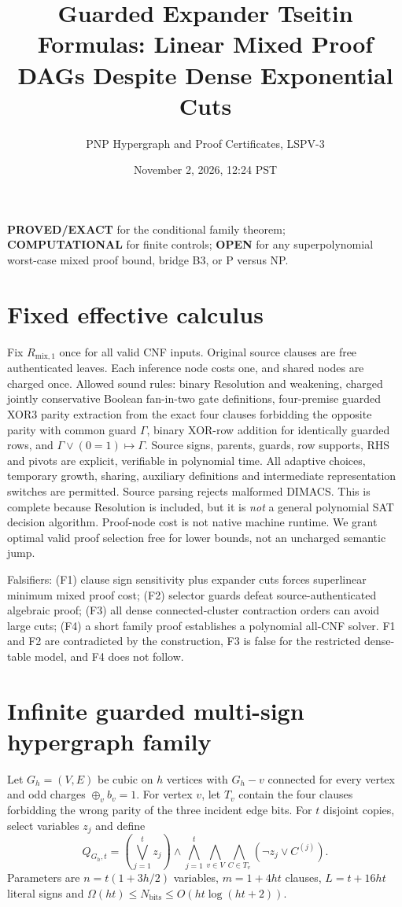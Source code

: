 \documentclass[11pt]{article}
\title{Guarded Expander Tseitin Formulas: Linear Mixed Proof DAGs Despite Dense Exponential Cuts}
\author{PNP Hypergraph and Proof Certificates, LSPV-3}
\date{November 2, 2026, 12:24 PST}
\begin{document}
\maketitle
\noindent\textbf{PROVED/EXACT} for the conditional family theorem; \textbf{COMPUTATIONAL} for finite controls; \textbf{OPEN} for any superpolynomial worst-case mixed proof bound, bridge B3, or P versus NP.

\section{Fixed effective calculus}
Fix $R_{\mathrm{mix},1}$ once for all valid CNF inputs. Original source clauses are free authenticated leaves. Each inference node costs one, and shared nodes are charged once. Allowed sound rules: binary Resolution and weakening, charged jointly conservative Boolean fan-in-two gate definitions, four-premise guarded XOR3 parity extraction from the exact four clauses forbidding the opposite parity with common guard $\Gamma$, binary XOR-row addition for identically guarded rows, and $\Gamma\vee(0=1)\mapsto\Gamma$. Source signs, parents, guards, row supports, RHS and pivots are explicit, verifiable in polynomial time. All adaptive choices, temporary growth, sharing, auxiliary definitions and intermediate representation switches are permitted. Source parsing rejects malformed DIMACS. This is complete because Resolution is included, but it is \emph{not} a general polynomial SAT decision algorithm. Proof-node cost is not native machine runtime. We grant optimal valid proof selection free for lower bounds, not an uncharged semantic jump.

Falsifiers: (F1) clause sign sensitivity plus expander cuts forces superlinear minimum mixed proof cost; (F2) selector guards defeat source-authenticated algebraic proof; (F3) all dense connected-cluster contraction orders can avoid large cuts; (F4) a short family proof establishes a polynomial all-CNF solver. F1 and F2 are contradicted by the construction, F3 is false for the restricted dense-table model, and F4 does not follow.

\section{Infinite guarded multi-sign hypergraph family}
Let $G_h=(V,E)$ be cubic on $h$ vertices with $G_h-v$ connected for every vertex and odd charges $\oplus_v b_v=1$. For vertex $v$, let $T_v$ contain the four clauses forbidding the wrong parity of the three incident edge bits. For $t$ disjoint copies, select variables $z_j$ and define
\[
Q_{G_h,t}=(\bigvee_{j=1}^t z_j)\wedge
\bigwedge_{j=1}^t\bigwedge_{v\in V}\bigwedge_{C\in T_v}
(\neg z_j\vee C^{(j)}).
\]
Parameters are $n=t(1+3h/2)$ variables, $m=1+4ht$ clauses, $L=t+16ht$ literal signs and $\Omega(ht)\le N_{\mathrm{bits}}\le O(ht\log(ht+2))$.
\end{document}
